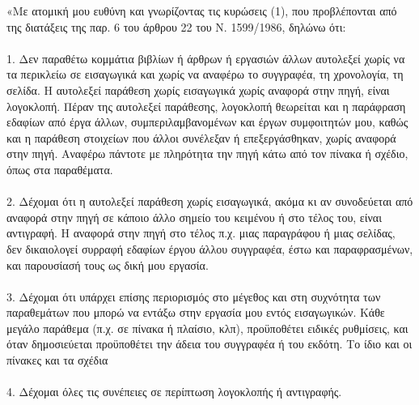 \documentclass[a4paper,one side,12pt]{book}
\author{DIMITRIOS KOURKOUTAS}
\newcommand\blankpage{%
    \null
    \thispagestyle{empty}%
    \addtocounter{page}{-1}%
    \newpage}
\begin{document}
\begin{title}

\maketitle

\frontmatter

\pagestyle{plain}

\end{title}

\setcounter{secnumdepth}{-1} 

\blankpage
{}
«Με ατομική μου ευθύνη και γνωρίζοντας τις κυρώσεις (1), που προβλέπονται από της διατάξεις της παρ. 6 του άρθρου 22 του Ν. 1599/1986, δηλώνω ότι:\\\\
1.    Δεν παραθέτω κομμάτια βιβλίων ή άρθρων ή εργασιών άλλων αυτολεξεί χωρίς να τα περικλείω σε εισαγωγικά και χωρίς να αναφέρω το συγγραφέα, τη χρονολογία, τη σελίδα. Η αυτολεξεί παράθεση χωρίς εισαγωγικά χωρίς αναφορά στην πηγή, είναι λογοκλοπή. Πέραν της αυτολεξεί παράθεσης, λογοκλοπή θεωρείται και η παράφραση εδαφίων από έργα άλλων, συμπεριλαμβανομένων και έργων συμφοιτητών μου, καθώς και η παράθεση στοιχείων που άλλοι συνέλεξαν ή επεξεργάσθηκαν, χωρίς αναφορά στην πηγή. Αναφέρω πάντοτε με πληρότητα την πηγή κάτω από τον πίνακα ή σχέδιο, όπως στα παραθέματα.\\\\
2.    Δέχομαι ότι η αυτολεξεί παράθεση χωρίς εισαγωγικά, ακόμα κι αν συνοδεύεται από αναφορά στην πηγή σε κάποιο άλλο σημείο του κειμένου ή στο τέλος του, είναι αντιγραφή. Η αναφορά στην πηγή στο τέλος π.χ. μιας παραγράφου ή μιας σελίδας, δεν δικαιολογεί συρραφή εδαφίων έργου άλλου συγγραφέα, έστω και παραφρασμένων, και παρουσίασή τους ως δική μου εργασία. \\\\
3.    Δέχομαι ότι υπάρχει επίσης περιορισμός στο μέγεθος και στη συχνότητα των παραθεμάτων που μπορώ να εντάξω στην εργασία μου εντός εισαγωγικών. Κάθε μεγάλο παράθεμα (π.χ. σε πίνακα ή πλαίσιο, κλπ), προϋποθέτει ειδικές ρυθμίσεις, και όταν δημοσιεύεται προϋποθέτει την άδεια του συγγραφέα ή του εκδότη. Το ίδιο και οι πίνακες και τα σχέδια\\\\
4. Δέχομαι όλες τις συνέπειες σε περίπτωση λογοκλοπής ή αντιγραφής.
\vspace{5em}
\end{document}
